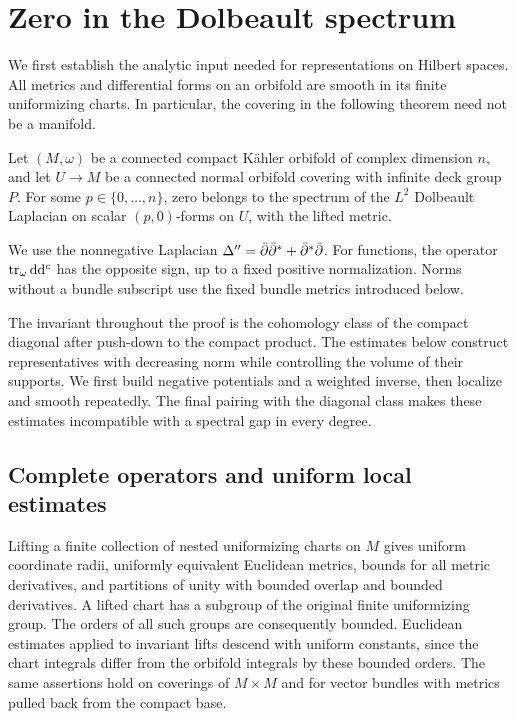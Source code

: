 \section{Zero in the Dolbeault spectrum}
\label{sec:spectral}

We first establish the analytic input needed for representations on Hilbert
spaces.  All metrics and differential forms on an orbifold are smooth in its
finite uniformizing charts.  In particular, the covering in the following
theorem need not be a manifold.

\begin{theorem}\label{thm:zero-spectrum}
Let $(M,\omega)$ be a connected compact K\"ahler orbifold of complex
dimension $n$, and let $U\to M$ be a connected normal orbifold covering with
infinite deck group $P$.  For some $p\in\{0,\ldots,n\}$, zero belongs to the
spectrum of the $L^2$ Dolbeault Laplacian on scalar $(p,0)$-forms on $U$,
with the lifted metric.
\end{theorem}

We use the nonnegative Laplacian
$\Delta''=\bar\partial\bar\partial^*+\bar\partial^*\bar\partial$.
For functions, the operator
$\operatorname{tr}_\omega\mathrm d\mathrm d^c$ has the opposite sign, up to a fixed positive
normalization.  Norms without a bundle subscript use the fixed bundle
metrics introduced below.

The invariant throughout the proof is the cohomology class of the
compact diagonal after push-down to the compact product. The estimates
below construct representatives with decreasing norm while controlling
the volume of their supports. We first build negative potentials and
a weighted inverse, then localize and smooth repeatedly. The final
pairing with the diagonal class makes these estimates incompatible
with a spectral gap in every degree.

\subsection{Complete operators and uniform local estimates}
\label{sp:operators}

Lifting a finite collection of nested uniformizing charts on $M$ gives
uniform coordinate radii, uniformly equivalent Euclidean metrics, bounds
for all metric derivatives, and partitions of unity with bounded overlap
and bounded derivatives.  A lifted chart has a subgroup of the original
finite uniformizing group.  The orders of all such groups are consequently
bounded.  Euclidean estimates applied to invariant lifts descend with
uniform constants, since the chart integrals differ from the orbifold
integrals by these bounded orders.  The same assertions hold on coverings
of $M\times M$ and for vector bundles with metrics pulled back from the
compact base.

